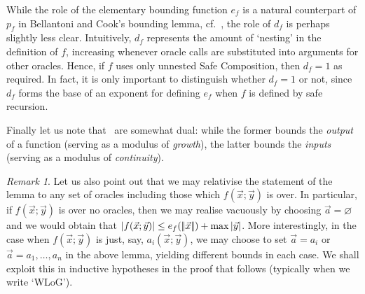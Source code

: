 \documentclass[manuscript,screen]{acmart}
\renewcommand{\emptyset}{\varnothing}
\theoremstyle{definition}
\theoremstyle{remark}
\newtheorem{rem}[thm]{Remark}
\newcommand{\sumlen}[1]{|\hspace{-.15em}|#1|\hspace{-.15em}|}
\begin{document}
While the role of the elementary bounding function $e_f$ is a natural counterpart of $p_f$ in Bellantoni and Cook's bounding lemma, cf.~, the role of $d_f$ is perhaps slightly less clear.
Intuitively, $d_f$ represents the amount of `nesting' in the definition of $f$, increasing whenever oracle calls are substituted into arguments for other oracles. 
Hence, if $f$ uses only unnested Safe Composition, then $d_f=1$ as required. 
In fact, it is only important to distinguish whether $d_f=1$ or not, since $d_f$ forms the base of an exponent for defining $e_f$ when $f$ is defined by safe recursion.

Finally let us note that~ are somewhat dual:  while the former bounds the \emph{output} of a function (serving as a modulus of \emph{growth}), the latter bounds the \emph{inputs} (serving as a modulus of \emph{continuity}).


\begin{rem}
Let us also point out that we may relativise the statement of the lemma to any set of oracles including those which $f(\vec x;\vec y)$ is over.
In particular, if $f(\vec x;\vec y)$ is over no oracles, then we may realise  vacuously by choosing $\vec a = \emptyset$ and we would obtain that $|f(\vec x;\vec y)| \leq e_f(\sumlen{\vec x}) + \max |\vec y|$.
More interestingly, in the case when $f(\vec x;\vec y)$ is just, say, $a_i(\vec x;\vec y)$, we may choose to set $\vec a = a_i$ or $\vec a = a_1,\dots, a_n$ in the above lemma, yielding different bounds in each case.
We shall exploit this in inductive hypotheses  in the proof that follows (typically when we write `WLoG').
\end{rem}
\end{document}
